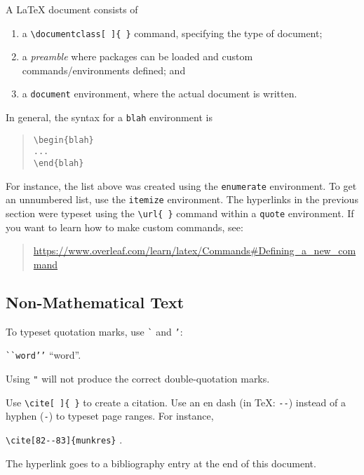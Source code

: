 \documentclass[a4paper,10pt,leqno]{article}
\numberwithin{equation}{section}
\theoremstyle{plain}
\theoremstyle{definition}
\theoremstyle{remark}
\begin{document}
A \LaTeX{} document consists of
\begin{enumerate} 
\item 	a \verb|\documentclass[ ]{ }| command, specifying the type of document; 

\item 	a \emph{preamble} where packages can be loaded and custom commands/environments defined; and

\item 	a \texttt{document} environment, where the actual document is written.

\end{enumerate}
In general, the syntax for a \texttt{blah} environment is
\begin{quote}
\verb|\begin{blah}|\\
\verb|...|\\
\verb|\end{blah}|
\end{quote}
For instance, the list above was created using the \texttt{enumerate} environment.
To get an unnumbered list, use the \texttt{itemize} environment.
The hyperlinks in the previous section were typeset using the \verb|\url{ }| command within a \texttt{quote} environment.
If you want to learn how to make custom commands, see:
\begin{quote}
\url{https://www.overleaf.com/learn/latex/Commands#Defining_a_new_command}
\end{quote}

\subsection{Non-Mathematical Text}

To typeset quotation marks, use \texttt{\`{}} and \texttt{'}:
\begin{center}
\texttt{\`{}\`{}word'{}'}
\quad
``word''.
\end{center}
Using \texttt{"} will not produce the correct double-quotation marks.

Use \texttt{\textbackslash{}cite[ ]\{ \}} to create a citation.
Use an en dash (in \TeX: \texttt{-{}-}) instead of a hyphen (\texttt{-}) to typeset page ranges.
For instance,
\begin{center}
\verb|\cite[82--83]{munkres}|
\quad
\cite[82--83]{munkres}.
\end{center}
The hyperlink goes to a bibliography entry at the end of this document.
\end{document}
